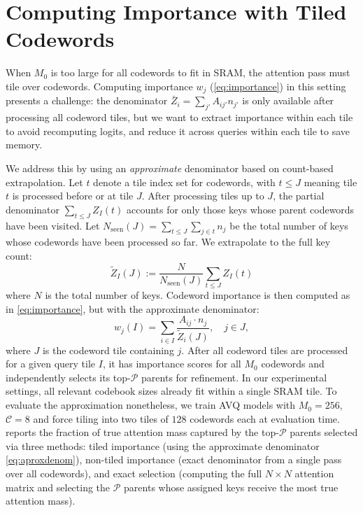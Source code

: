\section{Computing Importance with Tiled Codewords}
\label{app:importance_tiling}

When $M_0$ is too large for all codewords to fit in SRAM, the attention pass must tile over codewords. Computing importance $w_j$ (\cref{eq:importance}) in this setting presents a challenge: the denominator $\bar{Z}_i = \sum_{j'} A_{ij'} n_{j'}$ is only available after processing all codeword tiles, but we want to extract importance within each tile to avoid recomputing logits, and reduce it across queries within each tile to save memory.

We address this by using an \emph{approximate} denominator based on count-based extrapolation. Let $t$ denote a tile index set for codewords, with $t \leq J$ meaning tile $t$ is processed before or at tile $J$. After processing tiles up to $J$, the partial denominator $\sum_{t \leq J} Z_I(t)$ accounts for only those keys whose parent codewords have been visited. Let $N_{\text{seen}}(J) = \sum_{t \leq J} \sum_{j \in t} n_j$ be the total number of keys whose codewords have been processed so far. We extrapolate to the full key count:
\begin{equation}
\label{eq:aproxdenom}
\tilde{Z}_I(J) := \frac{N}{N_{\text{seen}}(J)} \sum_{t \leq J} Z_I(t)
\end{equation}
where $N$ is the total number of keys. Codeword importance is then computed as in \cref{eq:importance}, but with the approximate denominator:
\begin{equation}
\label{eq:codewordimportance}
w_j(I) = \sum_{i \in I} \frac{A_{ij} \cdot n_j}{\tilde{Z}_i(J)}, \quad j \in J,
\end{equation}
where $J$ is the codeword tile containing $j$. After all codeword tiles are processed for a given query tile $I$, it has importance scores for all $M_0$ codewords and independently selects its top-$\mathcal{P}$ parents for refinement. In our experimental settings, all relevant codebook sizes already fit within a single SRAM tile. To evaluate the approximation nonetheless, we train AVQ models with $M_0{=}256$, $\mathcal{C}{=}8$ and force tiling into two tiles of $128$ codewords each at evaluation time.  reports the fraction of true attention mass captured by the top-$\mathcal{P}$ parents selected via three methods: tiled importance (using the approximate denominator \cref{eq:aproxdenom}), non-tiled importance (exact denominator from a single pass over all codewords), and exact selection (computing the full $N{\times}N$ attention matrix and selecting the $\mathcal{P}$ parents whose assigned keys receive the most true attention mass).

